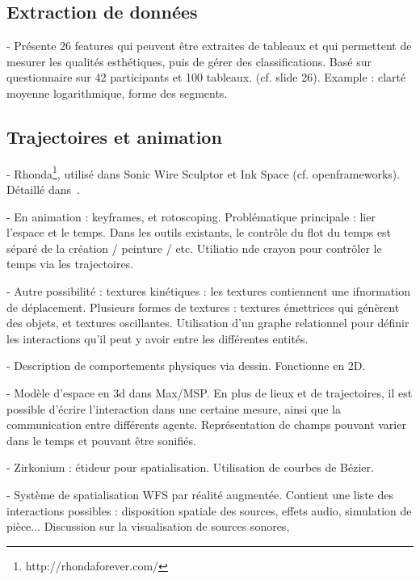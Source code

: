 \documentclass[french,12pt]{article}
\begin{document}
\subsection{Extraction de données}
- Présente 26 features qui peuvent être extraites de tableaux et qui permettent de mesurer les qualités esthétiques, puis de gérer des classifications. Basé sur questionnaire sur 42 participants et 100 tableaux. \cite{li_aesthetic_2009} (cf. slide 26).
Example : clarté moyenne logarithmique, forme des segments.

\subsection{Trajectoires et animation}
- Rhonda\footnote{http://rhondaforever.com/}, utilisé dans Sonic Wire Sculptor et Ink Space (cf. openframeworks). Détaillé dans~\cite{rasmuson_flying_2013}.

- En animation : keyframes, et rotoscoping. Problématique principale : lier l'espace et le temps. Dans les outils existants, le contrôle du flot du temps est séparé de la création / peinture / etc. Utiliatio nde crayon pour contrôler le temps via les trajectoires.
\cite{santosa_direct_2013}

- Autre possibilité : textures kinétiques : les textures contiennent une ifnormation de déplacement. Plusieurs formes de textures : textures émettrices qui génèrent des objets, et textures oscillantes. Utilisation d'un graphe relationnel pour définir les interactions qu'il peut y avoir entre les différentes entités.
\cite{kazi_kitty:_2014}

- Description de comportements physiques via dessin\cite{scott_physink:_2013}. Fonctionne en 2D.

\cite{garcia_jeremie_processing_2015,garcia_towards_2015} %

- Modèle d'espace en 3d dans Max/MSP. En plus de lieux et de trajectoires, il est possible d'écrire l'interaction dans une certaine mesure, ainsi que la communication entre différents agents. Représentation de champs pouvant varier dans le temps et pouvant être sonifiés.
\cite{wakefield_cosm:_2011}

- Zirkonium : étideur pour spatialisation. Utilisation de courbes de Bézier. 
\cite{wagner_introducing_2014}

- Système de spatialisation \ac{WFS} par réalité augmentée. Contient une liste des interactions possibles : disposition spatiale des sources, effets audio, simulation de pièce... Discussion sur la visualisation de sources sonores, 
\cite{melchior_authoring_2005} 
\end{document}
